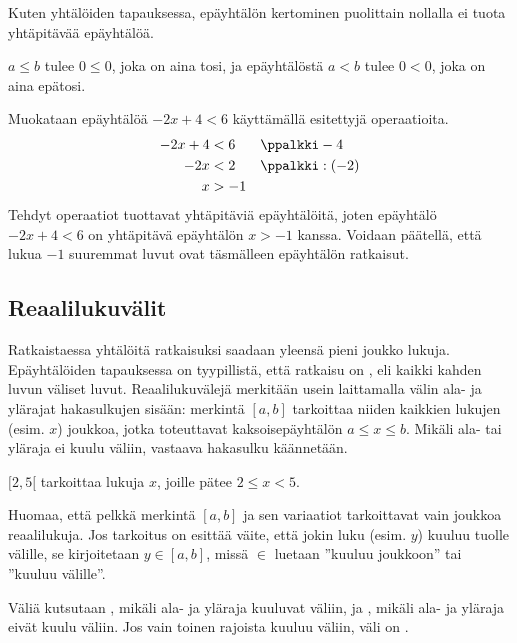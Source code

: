 Kuten yhtälöiden tapauksessa, epäyhtälön kertominen puolittain nollalla ei tuota yhtäpitävää epäyhtälöä.

\begin{esimerkki}
$a \leq b$ tulee $0 \leq 0$, joka on aina tosi, ja epäyhtälöstä $a < b$ tulee $0 < 0$, joka on aina epätosi.
\end{esimerkki}

\begin{esimerkki}
Muokataan epäyhtälöä $-2x+4<6$ käyttämällä esitettyjä operaatioita.
\begin{align*}
-2x+4&<6 && \ppalkki -4 \\
-2x&<2 && \ppalkki :(-2) \\
x&>-1
\end{align*}
Tehdyt operaatiot tuottavat yhtäpitäviä epäyhtälöitä, joten epäyhtälö $-2x+4<6$ on yhtäpitävä epäyhtälön $x>-1$ kanssa. Voidaan päätellä, että lukua $-1$ suuremmat luvut ovat täsmälleen epäyhtälön ratkaisut.
\end{esimerkki}

\subsection{Reaalilukuvälit}

Ratkaistaessa yhtälöitä ratkaisuksi saadaan yleensä pieni joukko lukuja. Epäyhtälöiden tapauksessa on tyypillistä, että ratkaisu on , eli kaikki kahden luvun väliset luvut. Reaalilukuvälejä merkitään usein laittamalla välin ala- ja ylärajat hakasulkujen sisään: merkintä $[a, b]$ tarkoittaa niiden kaikkien lukujen (esim. $x$) joukkoa, jotka toteuttavat kaksoisepäyhtälön $a \leq x \leq b$. Mikäli ala- tai yläraja ei kuulu väliin, vastaava hakasulku käännetään.

\begin{esimerkki}
$[2,5[$ tarkoittaa lukuja $x$, joille pätee $2 \leq x < 5$. %
\end{esimerkki}

Huomaa, että pelkkä merkintä $[a,b]$ ja sen variaatiot tarkoittavat vain joukkoa reaalilukuja. Jos tarkoitus on esittää väite, että jokin luku (esim. $y$) kuuluu tuolle välille, se kirjoitetaan $y \in [a,b]$, missä $\in$ luetaan ''kuuluu joukkoon'' tai ''kuuluu välille''.

Väliä kutsutaan , mikäli ala- ja yläraja kuuluvat väliin, ja , mikäli ala- ja yläraja eivät kuulu väliin. Jos vain toinen rajoista kuuluu väliin, väli on .

